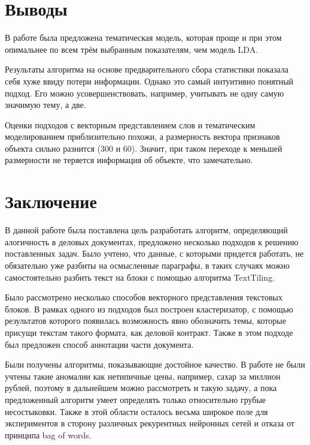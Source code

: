 \documentclass[12pt]{article}
\begin{document}
\newpage

\section{Выводы}
В работе была предложена тематическая модель, которая проще и при этом опимальнее по всем трём выбранным показателям, чем модель LDA. 

Результаты алгоритма на основе предварительного сбора статистики показала себя хуже ввиду потери информации. Однако это самый интуитивно понятный подход. Его можно усовершенствовать, например, учитывать не одну самую значимую тему, а две.

Оценки подходов с векторным представлением слов и тематическим моделированием приблизительно похожи, а размерность вектора признаков объекта сильно разнится (300 и 60). Значит, при таком переходе к меньшей размерности не теряется информация об объекте, что замечательно.

\newpage
\section{Заключение}
В данной работе была поставлена цель разработать алгоритм, определяющий алогичность в деловых документах, предложено несколько подходов к решению поставленных задач. Было учтено, что данные, с которыми придется работать, не обязательно уже разбиты на осмысленные параграфы, в таких случаях можно самостоятельно разбить текст на блоки с помощью алгоритма TextTiling. 

Было рассмотрено несколько способов векторного представления текстовых блоков. В рамках одного из подходов был построен кластеризатор, с помощью результатов которого появилась возможность явно обозначить темы, которые присущи текстам такого формата, как деловой контракт. Также в этом подходе был предложен способ аннотации части документа. 

Были получены алгоритмы, показывающие достойное качество. В работе не были учтены такие аномалии как нетипичные цены, например, сахар за миллион рублей, поэтому в дальнейшем можно рассмотреть и такую задачу, а пока предложенный алгоритм умеет определять только относительно грубые несостыковки. Также в этой области осталось весьма широкое поле для экспериментов в сторону различных рекурентных нейронных сетей и отказа от принципа bag of words.

\newpage
\end{document}
